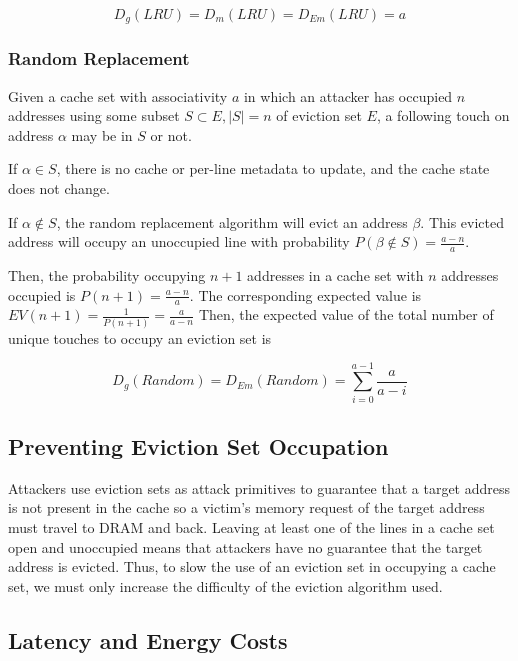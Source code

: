 \documentclass[letterpaper, twocolumn]{article}
\begin{document}
\begin{equation}\label{LRUExpectedD}
  D_g(LRU) = D_{m}(LRU) = D_{Em}(LRU) = a
\end{equation}

\subsubsection{Random Replacement}
Given a cache set with associativity $a$ in which an attacker has occupied $n$ addresses
using some subset $S \subset E, |S| = n$ of eviction set $E$,
a following touch on address $\alpha$ may be in $S$ or not.

If $\alpha \in S$, there is no cache or per-line metadata to update, and the cache state does not change.

If $\alpha \notin S$, the random replacement algorithm will evict an address $\beta$.
This evicted address will occupy an unoccupied line with probability
$P(\beta \notin S) = \frac{a-n}{a}$.

Then, the probability occupying $n+1$ addresses in a cache set with $n$ addresses occupied is $P(n+1) = \frac{a-n}{a}$.
The corresponding expected value is $EV(n+1) = \frac{1}{P(n+1)} = \frac{a}{a-n}$
Then, the expected value of the total number of unique touches to occupy an eviction set is

\begin{equation}\label{RandomExpected}
    D_g(Random) = D_{Em}(Random) = \sum_{i=0}^{a-1}{\frac{a}{a-i}}
\end{equation}

\subsection{Preventing Eviction Set Occupation}
Attackers use eviction sets as attack primitives to guarantee that a target address is not present in the cache
so a victim's memory request of the target address must travel to DRAM and back.
Leaving at least one of the lines in a cache set open and unoccupied means that attackers have no guarantee that the target address is evicted.
Thus, to slow the use of an eviction set in occupying a cache set, we must only increase the difficulty of the eviction algorithm used.

\subsection{Latency and Energy Costs}
\end{document}
